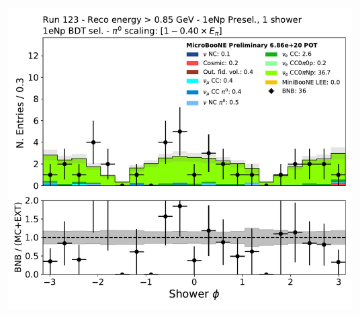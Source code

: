 \begin{figure}[H]
\begin{subfigure}{0.3\textwidth}
    \caption{}
    \end{subfigure}
    \begin{subfigure}{0.3\textwidth}
    \includegraphics[width=1.0\textwidth]{Sidebands/Figures/1eNp/HighEnergy/HiEext_NPOneShr_NPBDT_pi0e040/shr_phi.pdf}
    \caption{}
    \end{subfigure}
    \caption{} 
    \label{fig:HE_1eNp_10}
\end{figure}

